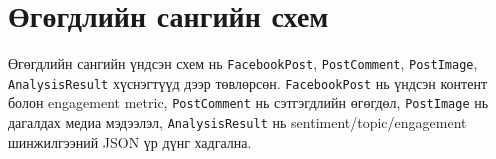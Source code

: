 \documentclass[
12pt,
oneside,
english,
onehalfspacing,
nolistspacing,
headsepline,
]{MUST-Thesis}
\begin{document}
\section{Өгөгдлийн сангийн схем}

Өгөгдлийн сангийн үндсэн схем нь \texttt{FacebookPost}, \texttt{PostComment}, \texttt{PostImage}, \texttt{AnalysisResult} хүснэгтүүд дээр төвлөрсөн. \texttt{FacebookPost} нь үндсэн контент болон engagement metric, \texttt{PostComment} нь сэтгэгдлийн өгөгдөл, \texttt{PostImage} нь дагалдах медиа мэдээлэл, \texttt{AnalysisResult} нь sentiment/topic/engagement шинжилгээний JSON үр дүнг хадгална.
\end{document}
